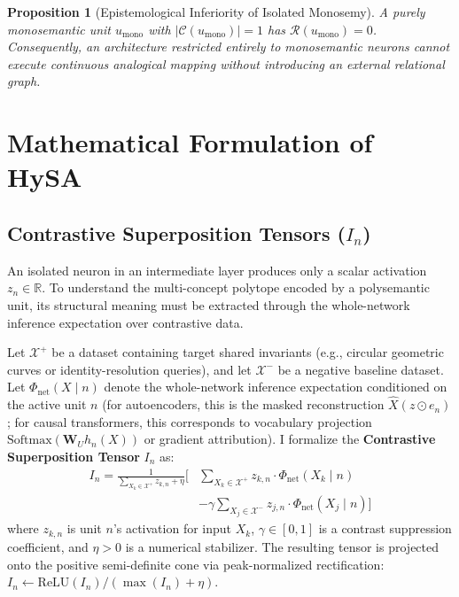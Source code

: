 \documentclass[10pt,twocolumn]{article}
\newtheorem{proposition}{Proposition}
\theoremstyle{definition}
\begin{document}
\begin{proposition}[Epistemological Inferiority of Isolated Monosemy]
A purely monosemantic unit $u_{\mathrm{mono}}$ with $|\mathcal{C}(u_{\mathrm{mono}})| = 1$ has $\mathcal{R}(u_{\mathrm{mono}}) = 0$. Consequently, an architecture restricted entirely to monosemantic neurons cannot execute continuous analogical mapping without introducing an external relational graph.
\end{proposition}

\section{Mathematical Formulation of HySA}

\subsection{Contrastive Superposition Tensors (\texorpdfstring{$I_n$}{In})}
An isolated neuron in an intermediate layer produces only a scalar activation $z_n \in \mathbb{R}$. To understand the multi-concept polytope encoded by a polysemantic unit, its structural meaning must be extracted through the whole-network inference expectation over contrastive data.

Let $\mathcal{X}^+$ be a dataset containing target shared invariants (e.g., circular geometric curves or identity-resolution queries), and let $\mathcal{X}^-$ be a negative baseline dataset. Let $\Phi_{\mathrm{net}}(X \mid n)$ denote the whole-network inference expectation conditioned on the active unit $n$ (for autoencoders, this is the masked reconstruction $\hat{X}(z \odot e_n)$; for causal transformers, this corresponds to vocabulary projection $\mathrm{Softmax}(\mathbf{W}_U h_n(X))$ or gradient attribution). I formalize the \textbf{Contrastive Superposition Tensor} $I_n$ as:
\begin{equation}
\begin{aligned}
    I_n = \frac{1}{\sum_{X_k \in \mathcal{X}^+} z_{k,n} + \eta} \Bigg[ & \sum_{X_k \in \mathcal{X}^+} z_{k,n} \cdot \Phi_{\mathrm{net}}(X_k \mid n) \\
    & - \gamma \sum_{X_j \in \mathcal{X}^-} z_{j,n} \cdot \Phi_{\mathrm{net}}(X_j \mid n) \Bigg]
\end{aligned}
\label{eq:imprinted_tensor}
\end{equation}
where $z_{k,n}$ is unit $n$'s activation for input $X_k$, $\gamma \in [0, 1]$ is a contrast suppression coefficient, and $\eta > 0$ is a numerical stabilizer. The resulting tensor is projected onto the positive semi-definite cone via peak-normalized rectification: $I_n \leftarrow \mathrm{ReLU}(I_n) / (\max(I_n) + \eta)$.
\end{document}
